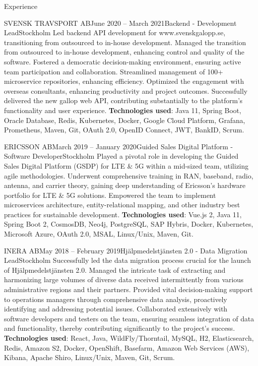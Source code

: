 \documentclass{resume}
\begin{document}
\begin{rSection}{Experience}
    \begin{rSubsection}{SVENSK TRAVSPORT AB}{June 2020 -- March 2021}{Backend - Development Lead}{Stockholm}
      \bItem Led backend API development for www.svenskgalopp.se, transitioning from outsourced to in-house development.
      \bItem Managed the transition from outsourced to in-house development, enhancing control and quality of the software.
      \bItem Fostered a democratic decision-making environment, ensuring active team participation and collaboration.
      \bItem Streamlined management of 100+ microservice repositories, enhancing efficiency.
      \bItem Optimized the engagement with overseas consultants, enhancing productivity and project outcomes.
      \bItem Successfully delivered the new gallop web API, contributing substantially to the platform's functionality and user experience.
      \bItem \textbf{Technologies used}: Java 11, Spring Boot, Oracle Database, Redis, Kubernetes, Docker, Google Cloud Platform, Grafana, Prometheus, Maven, Git, OAuth 2.0, OpenID Connect, JWT, BankID, Scrum.
    \end{rSubsection}

    \begin{rSubsection}{ERICSSON AB}{March 2019 -- January 2020}{Guided Sales Digital Platform - Software Developer}{Stockholm}
      \bItem Played a pivotal role in developing the Guided Sales Digital Platform (GSDP) for LTE \& 5G within a mid-sized team, utilizing agile methodologies.
      \bItem Underwent comprehensive training in RAN, baseband, radio, antenna, and carrier theory, gaining deep understanding of Ericsson's hardware portfolio for LTE \& 5G solutions.
      \bItem Empowered the team to implement microservices architecture, entity-relational mapping, and other industry best practices for sustainable development.
      \bItem \textbf{Technologies used}: Vue.js 2, Java 11, Spring Boot 2, CosmosDB, Neo4j, PostgreSQL, SAP Hybris, Docker, Kubernetes, Microsoft Azure, OAuth 2.0, MSAL, Linux/Unix, Maven, Git.
    \end{rSubsection}

    \begin{rSubsection}{INERA AB}{May 2018 -- February 2019}{Hjälpmedelstjänsten 2.0 - Data Migration Lead}{Stockholm}
      \bItem Successfully led the data migration process crucial for the launch of Hjälpmedelstjänsten 2.0.
      \bItem Managed the intricate task of extracting and harmonizing large volumes of diverse data received intermittently from various administrative regions and their partners.
      \bItem Provided vital decision-making support to operations managers through comprehensive data analysis, proactively identifying and addressing potential issues.
      \bItem Collaborated extensively with software developers and testers on the team, ensuring seamless integration of data and functionality, thereby contributing significantly to the project's success.
      \bItem \textbf{Technologies used}: React, Java, WildFly/Thorntail, MySQL, H2, Elasticsearch, Redis, Amazon S2, Docker, OpenShift, Basefarm, Amazon Web Services (AWS), Kibana, Apache Shiro, Linux/Unix, Maven, Git, Scrum.
    \end{rSubsection}


\end{rSection}
\end{document}
